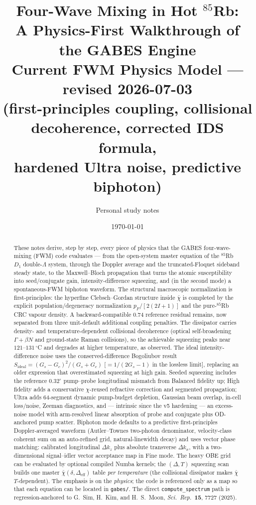\documentclass[11pt]{article}
\title{\textbf{Four-Wave Mixing in Hot \boldmath$^{85}$Rb:\\
A Physics-First Walkthrough of the GABES Engine}\\[0.3em]
\large Current FWM Physics Model --- revised 2026-07-03\\
(first-principles coupling, collisional decoherence, corrected IDS formula,\\
hardened Ultra noise, predictive biphoton)}
\author{Personal study notes}
\date{\today}
\newcommand{\eff}{\mathrm{eff}}
\newcommand{\code}[1]{\texttt{#1}}
\newcommand{\rhobar}{\bar{\chi}}
\begin{document}
\maketitle
\begin{abstract}
\noindent
These notes derive, step by step, every piece of physics that the GABES
four-wave-mixing (FWM) code evaluates --- from the open-system master equation of
the $^{85}$Rb $D_1$ double-$\Lambda$ system, through the Doppler average and the
truncated-Floquet sideband steady state, to the Maxwell--Bloch propagation that
turns the atomic susceptibility into seed/conjugate gain, intensity-difference
squeezing, and (in the second mode) a spontaneous-FWM biphoton waveform.
The structural macroscopic normalization is first-principles: the hyperfine
Clebsch--Gordan structure inside $\rhobar$ is completed by the explicit
population/degeneracy normalization $p_F/[2(2I+1)]$ and the pure-$^{85}$Rb CRC
vapour density. A backward-compatible $0.74$ reference residual remains, now
separated from three unit-default additional coupling penalties. The
dissipator carries density- and temperature-dependent collisional decoherence
(optical self-broadening $\Gamma+\beta N$ and ground-state Raman collisions), so
the achievable squeezing peaks near $121$--$131\,^\circ$C and degrades at higher
temperature, as observed. The ideal intensity-difference noise uses the
conserved-difference Bogoliubov result
$S_{\text{ideal}}=(G_s-G_c)^2/(G_s+G_c)$ [$=1/(2G_s-1)$ in the lossless limit],
replacing an older expression that overestimated squeezing at high gain. Seeded
squeezing includes the reference $0.32^\circ$ pump--probe longitudinal mismatch
from Balanced fidelity up; High fidelity adds a conservative $\chi$-reused
refractive correction and segmented propagation; Ultra adds 64-segment dynamic
pump-budget depletion, Gaussian beam overlap, in-cell loss/noise, Zeeman
diagnostics, and --- intrinsic since the v5 hardening --- an excess-noise model
with arm-resolved linear absorption of probe and conjugate plus OD-anchored pump
scatter. Biphoton mode defaults to a predictive first-principles Doppler-averaged
waveform (Autler--Townes two-photon denominator, velocity-class coherent sum on
an auto-refined grid, natural-linewidth decay) and uses vector phase matching:
calibrated longitudinal $\Delta k_z$ plus absolute transverse $\Delta k_x$, with
a two-dimensional signal--idler vector acceptance map in Fine mode. The heavy OBE
grid can be evaluated by optional compiled Numba kernels; the $(\Delta,T)$
squeezing scan builds one master $\rhobar(\delta,\Delta_\eff)$ table \emph{per
temperature} (the collisional dissipator makes $\rhobar$ $T$-dependent). The
emphasis is on the \emph{physics}; the code is referenced only as a map so that
each equation can be located in \code{gabes/}. The direct
\code{compute\_spectrum} path is regression-anchored to
G.~Sim, H.~Kim, and H.~S.~Moon, \emph{Sci.\ Rep.}\ \textbf{15}, 7727 (2025).
\end{abstract}
\end{document}
